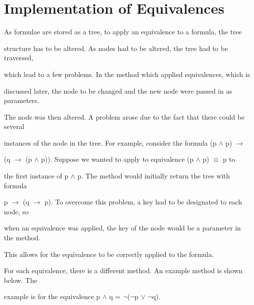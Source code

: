 \documentclass{report}
\begin{document}
\section{Implementation of Equivalences}



As formulae are stored as a tree, to apply an equivalence to a formula, the tree

structure has to be altered. As nodes had to be altered, the tree had to be traversed,

which lead to a few problems. In the method which applied equivalences, which is

discussed later, the node to be changed and the new node were passed in as parameters.

The node was then altered. A problem arose due to the fact that there could be several

instances of the node in the tree. For example, consider the formula (p $\land$ p) $\to$ 

(q $\to$ (p $\land$ p)). Suppose we wanted to apply to equivalence (p $\land$ p) $\equiv$ p to

the first instance of p $\land$ p. The method would initially return the tree with formula 

p $\to$ (q $\to$ p). To overcome this problem, a key had to be designated to each node, so

when an equivalence was applied, the key of the node would be a parameter in the method.

This allows for the equivalence to be correctly applied to the formula.



For each equivalence, there is a different method. An example method is shown below. The

example is for the equivalence  p $\land$ q = $\neg$($\neg$p $\lor$ $\neg$q).
\end{document}

